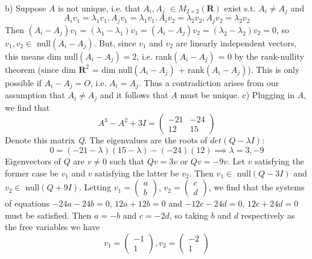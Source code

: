 \documentclass[12pt]{article}
\renewcommand{\=}[1]{\stackrel{#1}{=}} %
\theoremstyle{definition}
\begin{document}
\noindent b) Suppose $A$ is not unique, i.e. that $A_i, A_j$ $\in M_{2\times2}(\textbf{R})$ exist s.t. $A_i \neq A_j$ and $$A_iv_1 = \lambda_1v_1, A_jv_1 = \lambda_1v_1, A_iv_2 = \lambda_2v_2, A_jv_2 = \lambda_2v_2$$Then $(A_i - A_j)v_1 = (\lambda_1 - \lambda_1)v_1 = (A_i - A_j)v_2 = (\lambda_2 - \lambda_2)v_2 = 0$, so $v_1, v_2 \in$ null$(A_i - A_j)$. But, since $v_1$ and $v_2$ are linearly independent vectors, this means dim null$(A_i - A_j) = 2$, i.e. rank$(A_i - A_j)$ = 0 by the rank-nullity theorem (since dim $\textbf{R}^2$ = dim null$(A_i - A_j)$ + rank$(A_i - A_j)$). This is only possible if $A_i - A_j = O$, i.e. $A_i = A_j$. Thus a contradiction arises from our assumption that $A_i \neq A_j$ and it follows that $A$ must be unique.
\newpage
\noindent c) Plugging in $A$, we find that $$A^3 - A^2 + 3I = \begin{pmatrix}
    -21 &-24\\
    12 & 15
\end{pmatrix}$$Denote this matrix \textit{Q}. The eigenvalues are the roots of $det(Q - \lambda I)$: $$0 = (-21 - \lambda)(15 - \lambda) - (-24)(12)\implies \lambda = 3, -9$$Eigenvectors of $Q$ are $v\neq 0$ such that $Qv = 3v$ or $Qv = -9v$. Let $v$ satisfying the former case be $v_1$ and $v$ satisfying the latter be $v_2$. Then $v_1\in$ null$(Q-3I)$ and $v_2 \in$ null$(Q + 9I)$. Letting $v_1 = \begin{pmatrix}
    a\\
    b
\end{pmatrix}$, $v_2 = \begin{pmatrix}
    c\\
    d
\end{pmatrix}$, we find that the systems of equations $-24a - 24b = 0$, $12a + 12b = 0$ and $-12c - 24d = 0$, $12c + 24d = 0$ must be satisfied. Then $a = -b$ and $c = -2d$, so taking $b$ and $d$ respectively as the free variables we have $$v_1 = \begin{pmatrix}
    -1\\
    1
\end{pmatrix}, v_2 = \begin{pmatrix}
    -2\\
    1
\end{pmatrix}$$
\end{document}
